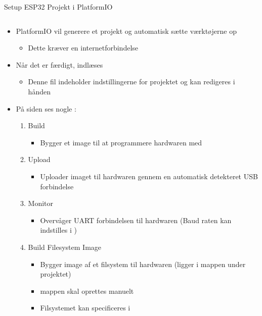 \documentclass[aspectratio=169]{beamer}
\begin{document}
\begin{frame}{Setup ESP32 Projekt i PlatformIO}
\begin{columns}
	\begin{column}{0.5\textwidth}
		\begin{textBox}
			\begin{itemize}
				\item PlatformIO vil generere et projekt og automatisk sætte værktøjerne op
				\begin{itemize}
					\item Dette kræver en internetforbindelse
				\end{itemize}
				\item Når det er færdigt, indlæses 
				\begin{itemize}
					\item Denne fil indeholder indstillingerne for projektet og kan redigeres i hånden
				\end{itemize}
				\item På siden ses nogle :
				\begin{enumerate}
					\item Build
					\begin{itemize}
						\item Bygger et image til at programmere hardwaren med
					\end{itemize}
					\item Upload
					\begin{itemize}
						\item Uploader imaget til hardwaren gennem en automatisk detekteret USB forbindelse
					\end{itemize}
					\item Monitor
					\begin{itemize}
						\item Overvåger UART forbindelsen til hardwaren (Baud raten kan indstilles i )
					\end{itemize}
					\item Build Filesystem Image
					\begin{itemize}
						\item Bygger image af et filsystem til hardwaren (ligger i  mappen under projektet)
						\item {} mappen skal oprettes manuelt
						\item Filsystemet kan specificeres i 
					\end{itemize}

\end{enumerate}
\end{itemize}
\end{textBox}
\end{column}
\end{columns}
\end{frame}
\end{document}
